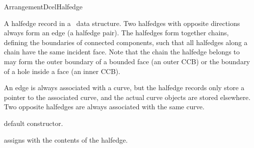 
\ccRefPageBegin

\begin{ccRefConcept}{ArrangementDcelHalfedge}

\ccDefinition

A halfedge record in a \dcel\ data structure. Two halfedges with opposite
directions always form an edge (a halfedge pair). The halfedges form together
chains, defining the boundaries of connected components, such that all
halfedges along a chain have the same incident face. Note that the chain the
halfedge belongs to may form the outer boundary of a bounded face (an outer
CCB) or the boundary of a hole inside a face (an inner CCB). 

An edge is always associated with a curve, but the halfedge records only
store a pointer to the associated curve, and the actual curve objects
are stored elsewhere. Two opposite halfedges are always associated with
the same curve.


\ccTypes

\ccGlue
{}
\ccGlue
{}


\ccCreation

   {default constructor.}

   {assigns \ccVar{} with the contents of the  halfedge.}

\end{ccRefConcept}
